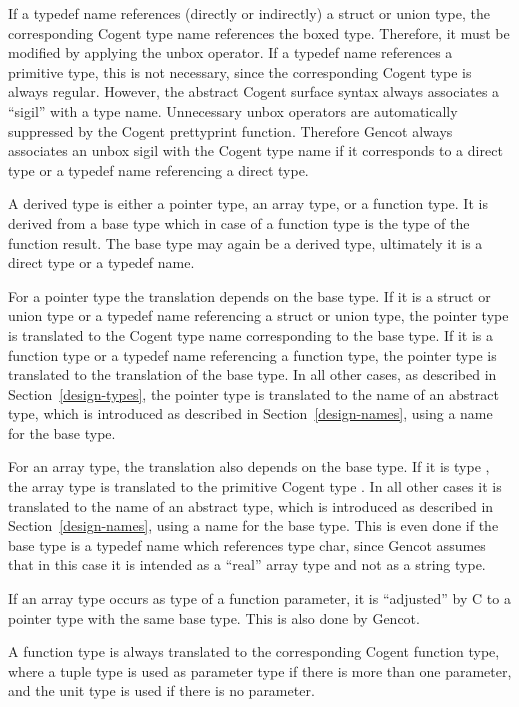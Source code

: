 If a typedef name references (directly or indirectly) a struct or union type, the corresponding Cogent
type name references the boxed type. Therefore, it must be modified by applying the unbox operator. If a typedef
name references a primitive type, this is not necessary, since the corresponding Cogent type is always regular.
However, the abstract Cogent surface syntax always associates a ``sigil'' with a type name. Unnecessary
unbox operators are automatically suppressed by the Cogent prettyprint function. Therefore Gencot always 
associates an unbox sigil with the Cogent type name if it corresponds to a direct type or a typedef name
referencing a direct type.

A derived type is either a pointer type, an array type, or a function type. It is derived from a base type
which in case of a function type is the type of the function result. The base type may again be a derived
type, ultimately it is a direct type or a typedef name.

For a pointer type the translation depends on the base type. If it is a struct or union type or a typedef
name referencing a struct or union type, the pointer type is translated to the Cogent type name corresponding
to the base type. If it is a function type or a typedef name referencing a function type, the pointer type 
is translated to the translation of the base type. In all other cases, as described in Section~\ref{design-types}, 
the pointer type is translated to the name of an abstract type, which is introduced as described in 
Section~\ref{design-names}, using a name for the base type. 

For an array type, the translation also depends on the base type. If it is type , the array 
type is translated to the primitive Cogent type . In all other cases it is translated 
to the name of an abstract type, which is introduced as described in Section~\ref{design-names}, 
using a name for the base type. This is even done if the base type is a typedef name which references
type char, since Gencot assumes that in this case it is intended as a ``real'' array type and not
as a string type.

If an array type occurs as type of a function parameter, it is ``adjusted'' by C to a pointer type with
the same base type. This is also done by Gencot. 

A function type is always translated to the corresponding Cogent function type, where a tuple type is
used as parameter type if there is more than one parameter, and the unit type is used if there is
no parameter. 

